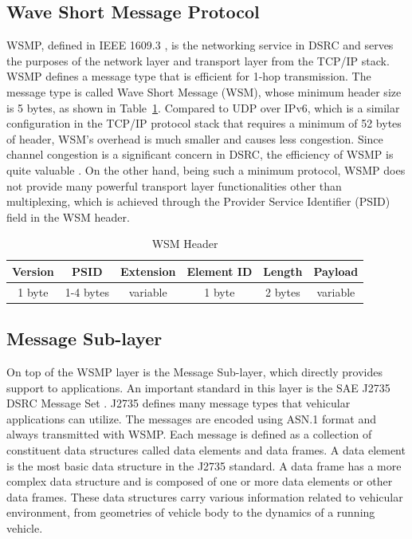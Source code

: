 \documentclass[12pt]{report}
\begin{document}
\subsection{Wave Short Message Protocol}
WSMP, defined in IEEE 1609.3 \cite{ieee16093}, is the networking service in DSRC and serves the purposes of the network layer and transport layer from the TCP/IP stack. WSMP defines a message type that is efficient for 1-hop transmission. The message type is called Wave Short Message (WSM), whose minimum header size is 5 bytes, as shown in Table~\ref{tab:wsm}. Compared to UDP over IPv6, which is a similar configuration in the TCP/IP protocol stack that requires a minimum of 52 bytes of header, WSM's overhead is much smaller and causes less congestion. Since channel congestion is a significant concern in DSRC, the efficiency of WSMP is quite valuable \cite{kenney2011}. On the other hand, being such a minimum protocol, WSMP does not provide many powerful transport layer functionalities other than multiplexing, which is achieved through the Provider Service Identifier (PSID) field in the WSM header.

\begin{table}[h]
  \begin{center}
    \begin{tabular}{|c|c|c|c|c|c|}
      \hline
      Version & PSID      & Extension   & Element ID & Length  & Payload \\ \hline
      1 byte  & 1-4 bytes & variable    & 1 byte     & 2 bytes & variable \\ \hline
    \end{tabular}
    \caption{\label{tab:wsm}WSM Header}
  \end{center}
\end{table}

\subsection{Message Sub-layer}
On top of the WSMP layer is the Message Sub-layer, which directly provides support to applications. An important standard in this layer is the SAE J2735 DSRC Message Set \cite{sae2016j2735}. J2735 defines many message types that vehicular applications can utilize. The messages are encoded using ASN.1 format and always transmitted with WSMP. Each message is defined as a collection of constituent data structures called data elements and data frames. A data element is the most basic data structure in the J2735 standard. A data frame has a more complex data structure and is composed of one or more data elements or other data frames. \cite{kenney2011} These data structures carry various information related to vehicular environment, from geometries of vehicle body to the dynamics of a running vehicle.
\end{document}
